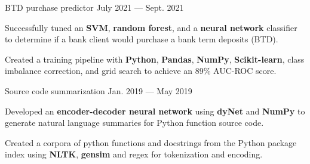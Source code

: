 
\vspace{-0.2cm}

\begin{cventries}

  \cventry
    {} %
    {BTD purchase predictor \href{https://github.com/pauldhein/marketing-campaign-classifier}{\faExternalLink}} %
    {July 2021 --- Sept. 2021} %
    {} %
    {
      \vspace{-1cm}
      \begin{cvitems} %
        \item Successfully tuned an \textbf{SVM}, \textbf{random forest}, and a \textbf{neural network} classifier to determine if a bank client would purchase a bank term deposits (BTD).
        \item Created a training pipeline with \textbf{Python}, \textbf{Pandas}, \textbf{NumPy}, \textbf{Scikit-learn}, class imbalance correction, and grid search to achieve an 89\% AUC-ROC score. 
      \end{cvitems}
    }
  \vspace{.2cm}
  \cventry
    {} %
    {Source code summarization \href{https://github.com/pauldhein/code-summarization}{\faExternalLink}} %
    {Jan. 2019 --- May 2019} %
    {} %
    {
      \vspace{-1cm}
      \begin{cvitems} %
        \item Developed an \textbf{encoder-decoder neural network} using \textbf{dyNet} and \textbf{NumPy} to generate natural language summaries for Python function source code.
        \item Created a corpora of python functions and docstrings from the Python package index using \textbf{NLTK}, \textbf{gensim} and regex for tokenization and encoding.
      \end{cvitems}
    }

\end{cventries}
